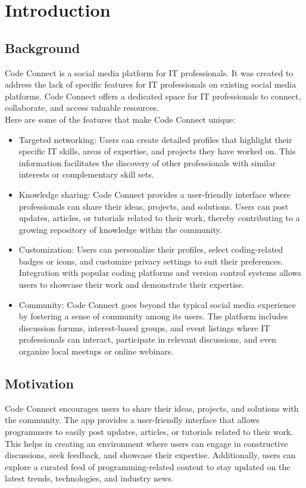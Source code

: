 \documentclass[12pt]{article}
\begin{document}
\section{Introduction}

\subsection{Background}
Code Connect is a social media platform for IT professionals. It was created to address the lack of specific features for IT professionals on existing social media platforms. Code Connect offers a dedicated space for IT professionals to connect, collaborate, and access valuable resources.\\
Here are some of the features that make Code Connect unique:
\begin{itemize}
    \item Targeted networking: Users can create detailed profiles that highlight their specific IT skills, areas of expertise, and projects they have worked on. This information facilitates the discovery of other professionals with similar interests or complementary skill sets.
    \item Knowledge sharing: Code Connect provides a user-friendly interface where professionals can share their ideas, projects, and solutions. Users can post updates, articles, or tutorials related to their work, thereby contributing to a growing repository of knowledge within the community.
    \item Customization: Users can personalize their profiles, select coding-related badges or icons, and customize privacy settings to suit their preferences. Integration with popular coding platforms and version control systems allows users to showcase their work and demonstrate their expertise.
    \item Community: Code Connect goes beyond the typical social media experience by fostering a sense of community among its users. The platform includes discussion forums, interest-based groups, and event listings where IT professionals can interact, participate in relevant discussions, and even organize local meetups or online webinars.
\end{itemize}


\subsection{Motivation}


 Code Connect encourages users to share their ideas, projects, and solutions with the community. The app provides a user-friendly interface that allows programmers to easily post updates, articles, or tutorials related to their work. This helps in creating an environment where users can engage in constructive discussions, seek feedback, and showcase their expertise. Additionally, users can explore a curated feed of programming-related content to stay updated on the latest trends, technologies, and industry news.
\end{document}
